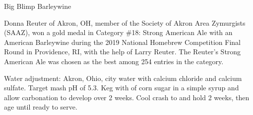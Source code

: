 \stylesection{\styleamericanbarleywine}

\begin{recipe}{Big Blimp Barleywine}

\begin{aboutblock}
Donna Reuter of Akron, OH, member of the Society of Akron Area Zymurgists (SAAZ),
won a gold medal in Category \#18: Strong American Ale with an American Barleywine
during the 2019 National Homebrew Competition Final Round in Providence, RI, with
the help of Larry Reuter. The Reuter's Strong American Ale was chosen as the best
among 254 entries in the category.
\sourceaha
\end{aboutblock}


\begin{methodandtiming}
 
\begin{mashsteps}
\end{mashsteps}

\begin{fermentationsteps}

\end{fermentationsteps}

\begin{directions}
Water adjustment: Akron, Ohio, city water with  calcium chloride and
 calcium sulfate. Target mash pH of 5.3. Keg with 
of corn sugar in a simple syrup and allow carbonation to develop over 2 weeks.
Cool crash to  and hold 2 weeks, then age until ready to serve.
\end{directions}

\end{methodandtiming}

\recipebreak

\begin{ingredientsblock}

\begin{malts}
\end{malts}


\end{ingredientsblock}
\end{recipe}
